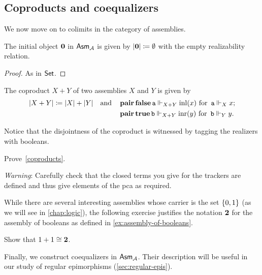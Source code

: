 \subsection{Coproducts and coequalizers}
%
We now move on to colimits in the category of assemblies.

\begin{proposition}
  The initial object \(\mathbf 0\) in \(\mathsf{Asm}_{\mathcal A}\) is given by
  \( \lvert\mathbf 0\rvert \coloneq \emptyset \) with the empty realizability
  relation.
\end{proposition}
\begin{proof}
  As in \(\mathsf{Set}\).
\end{proof}

\begin{proposition}[Coproducts]\label{coproducts}
  The coproduct \(X + Y\) of two assemblies \(X\) and \(Y\) is given by
  \begin{align*}
    \lvert X + Y\rvert \coloneq \lvert X\rvert + \lvert Y\rvert
    \quad\text{and}\quad
    &\operatorname{\mathbf{pair}}\operatorname{\mathbf{false}}\operatorname{\mathtt{a}} \Vdash_{X + Y} \operatorname{inl}(x)
      \text{ for } \operatorname{\mathtt{a}} \Vdash_X x;
    \\
    &\operatorname{\mathbf{pair}}\operatorname{\mathbf{true}}\operatorname{\mathtt{b}} \Vdash_{X + Y} \operatorname{inr}(y)
    \text{ for }
    \operatorname{\mathtt{b}} \Vdash_Y y.
  \end{align*}
\end{proposition}

Notice that the disjointness of the coproduct is witnessed by tagging the
realizers with booleans.

\begin{exercise}\label{exer:coproducts}
  Prove~\cref{coproducts}.

  \emph{Warning}: Carefully check that the closed terms you give for the
  trackers are defined and thus give elements of the pca as required.
\end{exercise}

While there are several interesting assemblies whose carrier is the set
\(\{0,1\}\) (as we will see in \cref{chap:logic}), the following exercise
justifies the notation \(\mathbf 2\) for the assembly of booleans as defined in
\cref{ex:assembly-of-booleans}.

\begin{exercise}\label{exer:coproduct-booleans}
  Show that \({1 + 1} \cong \mathbf 2\).
\end{exercise}

Finally, we construct coequalizers in \(\mathsf{Asm}_{\mathcal A}\). Their description will be
useful in our study of regular epimorphisms (\cref{sec:regular-epis}).

